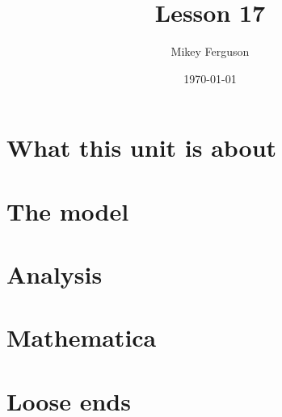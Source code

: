 \documentclass[11pt]{article}
\title{Lesson 17}
\author{Mikey Ferguson}
\date{\today}
\begin{document}
\maketitle
\tableofcontents
\bigskip

\section{What this unit is about}

\section{The model}

\section{Analysis}

\section{Mathematica}

\section{Loose ends}
\end{document}
